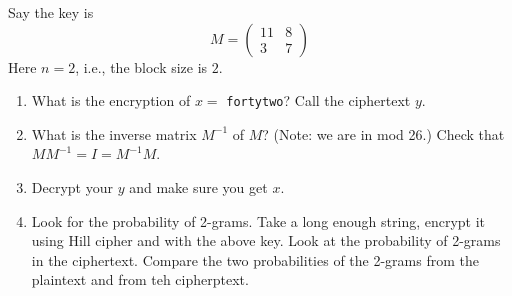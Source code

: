   Say the key is
  \[
  M = 
    \begin{pmatrix}
      11 & 8 \\
      3 & 7 
    \end{pmatrix}
    \]
    Here $n = 2$, i.e., the block size is $2$.
    \begin{enumerate}[nosep]
      \item
        What is the encryption of $x = $ \verb!fortytwo!?
        Call the ciphertext $y$.
      \item What is the inverse matrix $M^{-1}$ of $M$?
        (Note: we are in mod 26.)
        Check that $MM^{-1} = I = M^{-1}M$.
      \item Decrypt your $y$ and make sure you get $x$.
      \item
        Look for the probability of 2-grams.
        Take a long enough string, encrypt it using Hill cipher
        and with the above key. Look at the probability of 2-grams
        in the ciphertext.
        Compare the two probabilities of the 2-grams from the plaintext
        and from teh cipherptext.
    \end{enumerate}
